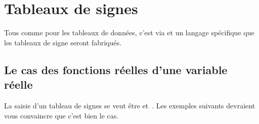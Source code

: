 \documentclass[10pt, a4paper]{article}
\begin{document}
\section{Tableaux de signes}

\begin{tdocnote}
	Tous comme pour les tableaux de données, c'est via  et un langage spécifique que les tableaux de signe seront fabriqués.
\end{tdocnote}




\subsection{Le cas des fonctions réelles d'une variable réelle}

La saisie d'un tableau de signes se veut être  et \,. Les exemples suivants devraient vous convaincre que c'est bien le cas.
\end{document}
